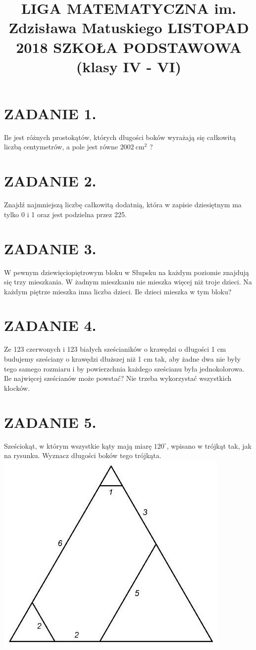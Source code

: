 \documentclass[10pt]{article}
\title{LIGA MATEMATYCZNA im. Zdzisława Matuskiego LISTOPAD 2018 SZKOŁA PODSTAWOWA (klasy IV - VI) }
\author{}
\date{}
\begin{document}
\maketitle
\section*{ZADANIE 1.}
Ile jest różnych prostokątów, których długości boków wyrażają się całkowitą liczbą centymetrów, a pole jest równe \(2002 \mathrm{~cm}^{2}\) ?

\section*{ZADANIE 2.}
Znajdź najmniejszą liczbę całkowitą dodatnią, która w zapisie dziesiętnym ma tylko 0 i 1 oraz jest podzielna przez 225.

\section*{ZADANIE 3.}
W pewnym dziewięciopiętrowym bloku w Słupsku na każdym poziomie znajdują się trzy mieszkania. W żadnym mieszkaniu nie mieszka więcej niż troje dzieci. Na każdym piętrze mieszka inna liczba dzieci. Ile dzieci mieszka w tym bloku?

\section*{ZADANIE 4.}
Ze 123 czerwonych i 123 białych sześcianików o krawędzi o długości 1 cm budujemy sześciany o krawędzi dłuższej niż 1 cm tak, aby żadne dwa nie były tego samego rozmiaru i by powierzchnia każdego sześcianu była jednokolorowa. Ile najwięcej sześcianów może powstać? Nie trzeba wykorzystać wszystkich klocków.

\section*{ZADANIE 5.}
Sześciokąt, w którym wszystkie kąty mają miarę \(120^{\circ}\), wpisano w trójkąt tak, jak na rysunku. Wyznacz długości boków tego trójkąta.\\
\includegraphics[max width=\textwidth, center]{2024_11_21_f6035da02386d0911452g-1}
\end{document}
